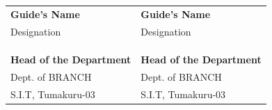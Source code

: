 \begin{titlepage}
\begin{tabular}{ll}
\textbf{Guide's Name} &\hspace*{5.0cm}\textbf{Guide's Name}\\%
Designation  & \hspace*{5.0cm} Designation \\ \\ \\ \\
\textbf{Head of the Department} &\hspace*{5.0cm}\textbf{Head of the Department}\\%
Dept. of BRANCH & \hspace*{5.0cm} Dept. of BRANCH \\
S.I.T, Tumakuru-03&\hspace*{5.0cm}S.I.T, Tumakuru-03\\[1.0cm]
\end{tabular}

\end{titlepage}
